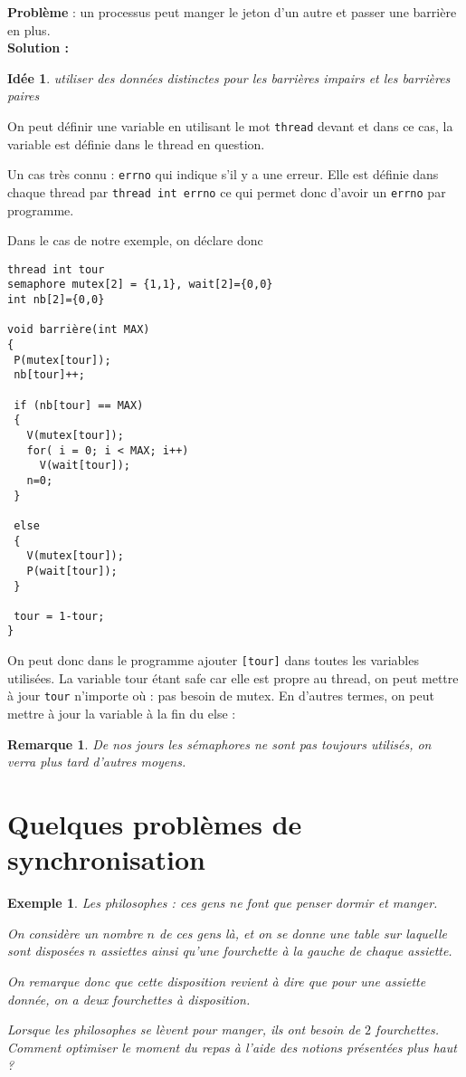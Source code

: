 \documentclass[12pt,a4paper]{report}
\newtheorem*{rem}{Remarque}
\newtheorem*{ex}{Exemple}
\newtheorem*{id}{Idée}
\begin{document}
\textbf{Problème} : un processus peut manger le jeton d'un autre et passer une barrière en plus.\\

\textbf{Solution : \\}
\begin{id} utiliser des données distinctes pour les barrières impairs et les barrières paires \end{id}

On peut définir une variable en utilisant le mot \verb?thread? devant et dans ce cas, la variable est définie dans le thread en question.

Un cas très connu : \texttt{errno} qui indique s'il y a une erreur. Elle est définie dans chaque thread par \verb?thread int errno? ce qui permet donc d'avoir un \texttt{errno} par programme.

\bigskip

Dans le cas de notre exemple, on déclare donc


\begin{verbatim}
thread int tour
semaphore mutex[2] = {1,1}, wait[2]={0,0}
int nb[2]={0,0}

void barrière(int MAX)
{
 P(mutex[tour]);
 nb[tour]++;

 if (nb[tour] == MAX)
 {
   V(mutex[tour]);
   for( i = 0; i < MAX; i++)
     V(wait[tour]);
   n=0;
 }

 else
 {
   V(mutex[tour]);
   P(wait[tour]);
 }

 tour = 1-tour;
}
\end{verbatim}

On peut donc dans le programme ajouter \verb?[tour]? dans toutes les variables utilisées.
La variable tour étant \og safe\fg{} car elle est propre  au thread, on peut mettre à jour \verb?tour? n'importe où : pas besoin de mutex. En d'autres termes, on peut mettre à jour la variable à la fin du else :



\begin{rem}
De nos jours les sémaphores ne sont pas toujours utilisés, on verra plus tard d'autres moyens.
\end{rem}

\section{Quelques problèmes de synchronisation}
\begin{ex}
  Les philosophes : ces gens ne font que penser dormir et manger.

On considère un nombre $n$ de ces gens là, et on se donne une table sur laquelle sont disposées
$n$ assiettes ainsi qu'une fourchette à la gauche de chaque assiette.

On remarque donc que cette disposition revient à dire que pour une assiette donnée, on a deux fourchettes à disposition.

Lorsque les philosophes se lèvent pour manger, ils ont besoin de $2$ fourchettes. Comment optimiser le moment du repas à l'aide des notions présentées plus haut ?
\end{ex}
\end{document}
